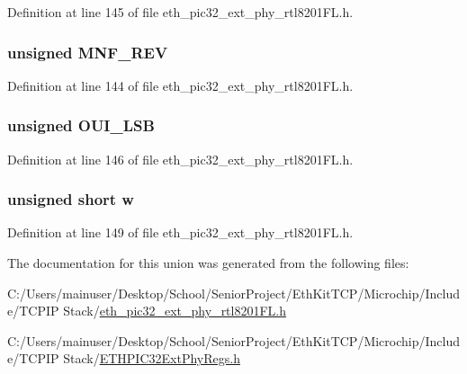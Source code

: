Definition at line 145 of file eth\+\_\+pic32\+\_\+ext\+\_\+phy\+\_\+rtl8201\+F\+L.\+h.

\hypertarget{union_____p_h_y_i_d2bits__t_ae0be20960cb0928819df0b687da7136e}{}
\subsubsection[{M\+N\+F\+\_\+\+R\+E\+V}]{\setlength{\rightskip}{0pt plus 5cm}unsigned M\+N\+F\+\_\+\+R\+E\+V}\label{union_____p_h_y_i_d2bits__t_ae0be20960cb0928819df0b687da7136e}


Definition at line 144 of file eth\+\_\+pic32\+\_\+ext\+\_\+phy\+\_\+rtl8201\+F\+L.\+h.

\hypertarget{union_____p_h_y_i_d2bits__t_a23fabf91be9157cf6b20f6c089dba136}{}
\subsubsection[{O\+U\+I\+\_\+\+L\+S\+B}]{\setlength{\rightskip}{0pt plus 5cm}unsigned O\+U\+I\+\_\+\+L\+S\+B}\label{union_____p_h_y_i_d2bits__t_a23fabf91be9157cf6b20f6c089dba136}


Definition at line 146 of file eth\+\_\+pic32\+\_\+ext\+\_\+phy\+\_\+rtl8201\+F\+L.\+h.

\hypertarget{union_____p_h_y_i_d2bits__t_a160850a4684a3e82c2323033964f2e98}{}
\subsubsection[{w}]{\setlength{\rightskip}{0pt plus 5cm}unsigned short w}\label{union_____p_h_y_i_d2bits__t_a160850a4684a3e82c2323033964f2e98}


Definition at line 149 of file eth\+\_\+pic32\+\_\+ext\+\_\+phy\+\_\+rtl8201\+F\+L.\+h.



The documentation for this union was generated from the following files\+:\begin{DoxyCompactItemize}
\item 
C\+:/\+Users/mainuser/\+Desktop/\+School/\+Senior\+Project/\+Eth\+Kit\+T\+C\+P/\+Microchip/\+Include/\+T\+C\+P\+I\+P Stack/\hyperlink{eth__pic32__ext__phy__rtl8201_f_l_8h}{eth\+\_\+pic32\+\_\+ext\+\_\+phy\+\_\+rtl8201\+F\+L.\+h}\item 
C\+:/\+Users/mainuser/\+Desktop/\+School/\+Senior\+Project/\+Eth\+Kit\+T\+C\+P/\+Microchip/\+Include/\+T\+C\+P\+I\+P Stack/\hyperlink{_e_t_h_p_i_c32_ext_phy_regs_8h}{E\+T\+H\+P\+I\+C32\+Ext\+Phy\+Regs.\+h}\end{DoxyCompactItemize}
